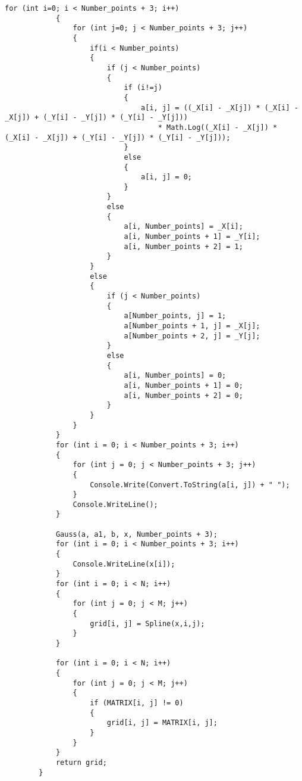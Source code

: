 \begin{lstlisting}[caption={Метод интерполяции сплайном}, label={ls:a:01}]
            for (int i=0; i < Number_points + 3; i++)
            {
                for (int j=0; j < Number_points + 3; j++)
                {
                    if(i < Number_points)
                    {
                        if (j < Number_points)
                        {
                            if (i!=j)
                            {
                                a[i, j] = ((_X[i] - _X[j]) * (_X[i] - _X[j]) + (_Y[i] - _Y[j]) * (_Y[i] - _Y[j]))
                                    * Math.Log((_X[i] - _X[j]) * (_X[i] - _X[j]) + (_Y[i] - _Y[j]) * (_Y[i] - _Y[j]));
                            }
                            else
                            {
                                a[i, j] = 0;
                            }
                        }
                        else
                        {
                            a[i, Number_points] = _X[i];
                            a[i, Number_points + 1] = _Y[i];
                            a[i, Number_points + 2] = 1;
                        }
                    }
                    else
                    {
                        if (j < Number_points)
                        {
                            a[Number_points, j] = 1;
                            a[Number_points + 1, j] = _X[j];
                            a[Number_points + 2, j] = _Y[j];
                        }
                        else
                        {
                            a[i, Number_points] = 0;
                            a[i, Number_points + 1] = 0;
                            a[i, Number_points + 2] = 0;
                        }
                    }
                }
            }
            for (int i = 0; i < Number_points + 3; i++)
            {
                for (int j = 0; j < Number_points + 3; j++)
                {
                    Console.Write(Convert.ToString(a[i, j]) + " ");
                }
                Console.WriteLine();
            }

            Gauss(a, a1, b, x, Number_points + 3);
            for (int i = 0; i < Number_points + 3; i++)
            {
                Console.WriteLine(x[i]);
            }
            for (int i = 0; i < N; i++)
            {
                for (int j = 0; j < M; j++)
                {
                    grid[i, j] = Spline(x,i,j);
                }
            }

            for (int i = 0; i < N; i++)
            {
                for (int j = 0; j < M; j++)
                {
                    if (MATRIX[i, j] != 0)
                    {
                        grid[i, j] = MATRIX[i, j];
                    }
                }
            }
            return grid;
        }
\end{lstlisting}

